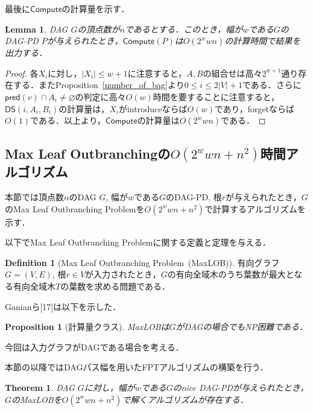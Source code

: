 \documentclass[master]{kuisthesis}		%
\theoremstyle{plain}
\newtheorem{theorem}{Theorem}
\newtheorem{proposition}{Proposition}
\newtheorem{lemma}{Lemma}
\theoremstyle{definition}
\newtheorem{definition*}{Definition}
\begin{document}
最後に$\mathsf{Compute}$の計算量を示す．

\begin{lemma}
    DAG $G$の頂点数が$n$であるとする．このとき，幅が$w$である$G$のDAG-PD $P$が与えられたとき，$\mathsf{Compute}(P)$は$O(2^wwn)$の計算時間で結果を出力する．
\end{lemma}

\begin{proof}
    各$X_i$に対し，$|X_i| \leq w+1$に注意すると，$A, B$の組合せは高々$2^{w+1}$通り存在する．またProposition~\ref{number_of_bag}より$0 \leq i \leq 2|V|+1$である．さらに$\mathsf{pred}(v) \cap A_i \neq \varnothing$の判定に高々$O(w)$時間を要することに注意すると，$\mathsf{DS}(i, A_i, B_i)$の計算量は，$X_i$がintroduceならば$O(w)$であり，forgetならば$O(1)$である．以上より，$\mathsf{Compute}$の計算量は$O(2^wwn)$である．
\end{proof}











\subsection{Max Leaf Outbranchingの$O(2^wwn+n^2)$時間アルゴリズム}

本節では頂点数$n$のDAG $G$, 幅が$w$である$G$のDAG-PD, 根$r$が与えられたとき，$G$のMax Leaf Outbranching Problemを$O(2^wwn+n^2)$で計算するアルゴリズムを示す．


以下でMax Leaf Outbranching Problemに関する定義と定理を与える．

\begin{definition*}[Max Leaf Outbranching Problem\ (MaxLOB)]
    有向グラフ $G=(V, E)$, 根$r \in V$が入力されたとき，$G$の有向全域木のうち葉数が最大となる有向全域木$T$の葉数を求める問題である．
\end{definition*}

Ganianら[17]は以下を示した．

\begin{proposition}[計算量クラス]
    MaxLOBは$G$がDAGの場合でもNP困難である．
\end{proposition}

今回は入力グラフがDAGである場合を考える．


本節の以降ではDAGパス幅を用いたFPTアルゴリズムの構築を行う．

\begin{theorem}
    DAG $G$に対し，幅が$w$である$G$のnice DAG-PDが与えられたとき，$G$のMaxLOBを$O(2^wwn+n^2)$で解くアルゴリズムが存在する．
\end{theorem}
\end{document}
